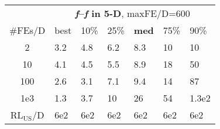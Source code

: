 \begin{tabular}{c|llllll}
 & \multicolumn{6}{|c}{\textbf{\textit{f}\raisebox{-0.35ex}{1}--\textit{f}\raisebox{-0.35ex}{24} in 5-D}, maxFE/D=600}\\
\#FEs/D & best & 10\% & 25\% & \textbf{med} & 75\% & 90\%\\
2 & \hspace*{1ex}3.2 & \hspace*{1ex}4.8 & \hspace*{1ex}6.2 & \hspace*{1ex}8.3 & 10 & 10\\
10 & \hspace*{1ex}4.1 & \hspace*{1ex}4.5 & \hspace*{1ex}5.5 & \hspace*{1ex}8.9 & 18 & 50\\
100 & \hspace*{1ex}2.6 & \hspace*{1ex}3.1 & \hspace*{1ex}7.1 & \hspace*{1ex}9.4 & 14 & 87\\
1e3 & \hspace*{1ex}1.3 & \hspace*{1ex}3.7 & 10 & 26 & 54 & 1.3e2\\
$\text{RL}_{\text{US}}$/D & 6e2 & 6e2 & 6e2 & 6e2 & 6e2 & 6e2
\end{tabular}
